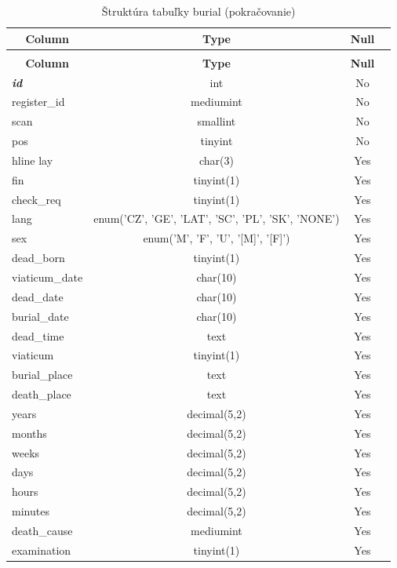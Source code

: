 \begin{longtable}{|l|c|c|c|}
 \caption{Štruktúra tabuľky burial} \label{tab:burial-structure} \\
 \hline \multicolumn{1}{|c|}{\textbf{Column}} & \multicolumn{1}{|c|}{\textbf{Type}} & \multicolumn{1}{|c|}{\textbf{Null}}\\ \hline \hline
\endfirsthead
 \caption{Štruktúra tabuľky burial (pokračovanie)} \\
 \hline \multicolumn{1}{|c|}{\textbf{Column}} & \multicolumn{1}{|c|}{\textbf{Type}} & \multicolumn{1}{|c|}{\textbf{Null}} \\ \hline \hline \endhead \endfoot
\textbf{\textit{id}} & int & No \\ \hline
register\_id & mediumint & No \\ \hline
scan & smallint & No \\ \hline
pos & tinyint & No \\ hline
lay & char(3) & Yes \\ \hline
fin & tinyint(1) & Yes \\ \hline
check\_req & tinyint(1) & Yes \\ \hline
lang & enum('CZ', 'GE', 'LAT', 'SC', 'PL', 'SK', 'NONE') & Yes \\ \hline
sex & enum('M', 'F', 'U', '[M]', '[F]') & Yes \\ \hline
dead\_born & tinyint(1) & Yes \\ \hline
viaticum\_date & char(10) & Yes \\ \hline
dead\_date & char(10) & Yes \\ \hline
burial\_date & char(10) & Yes \\ \hline
dead\_time & text & Yes \\ \hline
viaticum & tinyint(1) & Yes \\ \hline
burial\_place & text & Yes \\ \hline
death\_place & text & Yes \\ \hline
years & decimal(5,2) & Yes \\ \hline
months & decimal(5,2) & Yes \\ \hline
weeks & decimal(5,2) & Yes \\ \hline
days & decimal(5,2) & Yes \\ \hline
hours & decimal(5,2) & Yes \\ \hline
minutes & decimal(5,2) & Yes \\ \hline
death\_cause & mediumint & Yes \\ \hline
examination & tinyint(1) & Yes \\ \hline

\end{longtable}
